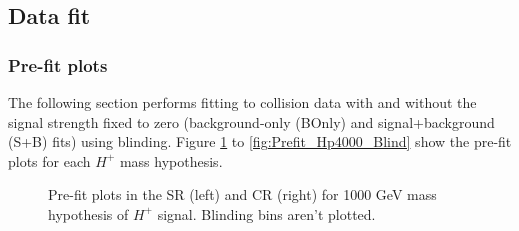 \subsection{Data fit}
\subsubsection{Pre-fit plots}
The following section performs fitting to collision data with and without the signal strength fixed to zero (background-only (BOnly) and signal+background (S+B) fits) using blinding. Figure \ref{fig:Prefit_Hp1000_Blind} to \ref{fig:Prefit_Hp4000_Blind} show the pre-fit plots for each $H^{+}$ mass hypothesis. 
\begin{figure}[H]
  \centering
  \caption{Pre-fit plots in the SR (left) and CR (right) for 1000 GeV mass hypothesis of $H^{+}$ signal. Blinding bins aren't plotted.}
  \label{fig:Prefit_Hp1000_Blind}
\end{figure}
